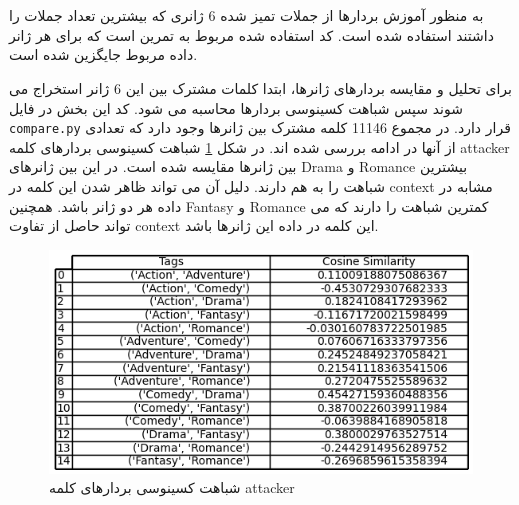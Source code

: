 \section{}
به منظور آموزش بردارها از جملات تمیز شده 6 ژانری که بیشترین تعداد جملات را داشتند استفاده شده است. کد استفاده شده مربوط به تمرین 
\textit{}
است که برای هر ژانر داده مربوط جایگزین شده است. 

برای تحلیل و مقایسه بردارهای ژانرها، ابتدا کلمات مشترک بین این 6 ژانر استخراج می شوند سپس شباهت کسینوسی بردارها محاسبه می شود. کد این بخش در فایل
\texttt{compare.py}
قرار دارد. در مجموع 11146 کلمه مشترک بین ژانرها وجود دارد که تعدادی از آنها در ادامه بررسی شده اند.
در شکل \ref{fig11} شباهت کسینوسی بردارهای کلمه attacker بین ژانرها مقایسه شده است. در این بین ژانرهای
Drama
و
Romance
بیشترین شباهت را به هم دارند. دلیل آن می تواند ظاهر شدن این کلمه در context مشابه در داده هر دو ژانر باشد. همچنین
Fantasy
و
Romance
کمترین شباهت را دارند که می تواند حاصل از تفاوت context این کلمه در داده این ژانرها باشد. 
 \begin{figure}[H]
	\centering
	
	\includegraphics[width=1\textwidth,height=1\textheight,keepaspectratio]{../reports/word2vec/attacker}
	\caption{شباهت کسینوسی بردارهای کلمه attacker}
	\label{fig11}
	
\end{figure} 

